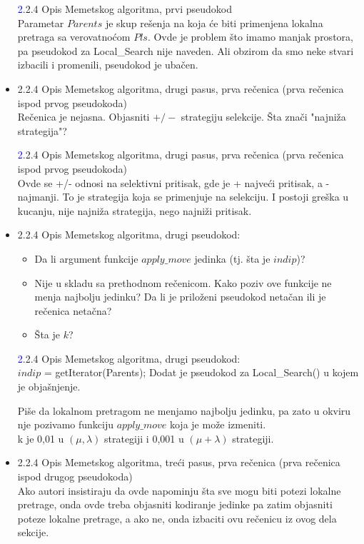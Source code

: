 \documentclass[a4paper]{report}
\newcommand{\odgovor}[1]{\textcolor{blue}{#1}}
\begin{document}
\begin{itemize}
    \odgovor  2.2.4 Opis Memetskog algoritma, prvi pseudokod \\
    Parametar $Parents$ je skup rešenja na koja će biti primenjena lokalna pretraga sa verovatnoćom $Pls$.
    Ovde je problem što imamo manjak prostora, pa pseudokod za Local\_Search nije naveden. Ali obzirom da smo neke stvari izbacili i promenili, pseudokod je ubačen.
    

    
    \item 2.2.4 Opis Memetskog algoritma, drugi pasus, prva rečenica (prva rečenica ispod prvog pseudokoda) \\
    Rečenica je nejasna. Objasniti $+/-$ strategiju selekcije. Šta znači "najniža strategija"?
 
    \odgovor 2.2.4 Opis Memetskog algoritma, drugi pasus, prva rečenica (prva rečenica ispod prvog pseudokoda)\\
    Ovde se +/- odnosi na selektivni pritisak, gde je + najveći pritisak, a - najmanji. To je strategija koja se primenjuje na selekciju. 
    I postoji greška u kucanju, nije najniža strategija, nego najniži pritisak.
    
    \item 2.2.4 Opis Memetskog algoritma, drugi pseudokod: 
        \begin{itemize}
            \item Da li argument funkcije $apply\_move$ jedinka (tj. šta je $indip$)? 
            
            \item Nije u skladu sa prethodnom rečenicom. Kako poziv ove funkcije ne menja najbolju jedinku? Da li je priloženi pseudokod netačan ili je rečenica netačna? 
            \item Šta je $k$?
            
  \end{itemize}
  
 \odgovor 2.2.4 Opis Memetskog algoritma, drugi pseudokod: \\
 $indip$ = getIterator(Parents); 
 Dodat je pseudokod za Local\_Search() u kojem je objašnjenje.

  Piše da lokalnom pretragom ne menjamo najbolju jedinku, pa zato u okviru nje pozivamo funkciju $apply\_move$ koja je može izmeniti. \\
  k je 0,01 u $(\mu,\lambda)$ strategiji i 0,001 u $(\mu + \lambda)$ strategiji.      
    
 
    \item 2.2.4 Opis Memetskog algoritma, treći pasus, prva rečenica (prva rečenica ispod drugog  pseudokoda) \\
    Ako autori insistiraju da ovde napominju šta sve mogu biti potezi lokalne pretrage, onda ovde treba objasniti kodiranje jedinke pa zatim objasniti poteze lokalne pretrage, a ako ne, onda izbaciti ovu rečenicu iz ovog dela sekcije.
    

\end{itemize}
\end{document}
